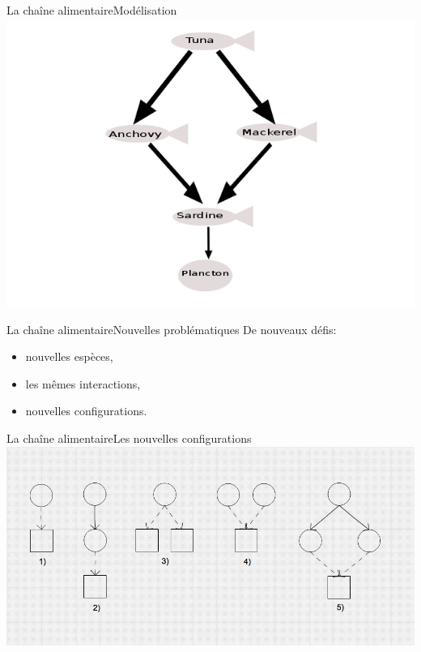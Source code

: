 \documentclass[t, 10pt]{beamer}
\begin{document}
        \begin{frame}{La chaîne alimentaire}{Modélisation}
          \includegraphics[height=0.9\textheight]{img/chaine_alimentaire.png}\centering
        \end{frame}
	
        
        \begin{frame}[c]{La chaîne alimentaire}{Nouvelles problématiques}
          De nouveaux défis:
          \begin{itemize}
          \item{nouvelles espèces,}
          \item{les mêmes interactions,}
          \item{nouvelles configurations.}
          \end{itemize}
          \vfill
        \end{frame}
        
        \begin{frame}{La chaîne alimentaire}{Les nouvelles configurations}
          \includegraphics[width=\textwidth]{img/configuration.png}
        \end{frame}
\end{document}
